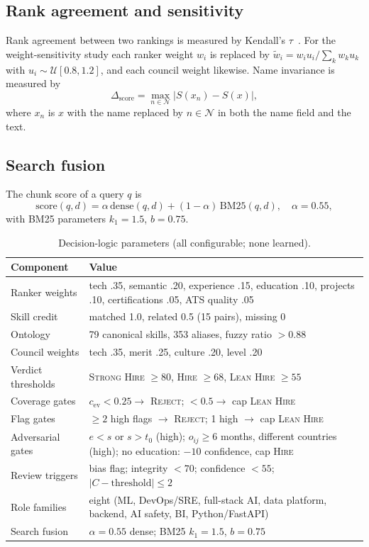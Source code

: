 \documentclass[conference]{IEEEtran}
\newcommand{\verd}[1]{\textsc{#1}}
\newcommand{\Sstrong}{\verd{Strong Hire}}
\newcommand{\Shire}{\verd{Hire}}
\newcommand{\Slean}{\verd{Lean Hire}}
\newcommand{\Sreject}{\verd{Reject}}
\begin{document}
\subsection{Rank agreement and sensitivity}
Rank agreement between two rankings is measured by Kendall's $\tau$~\cite{kendall}. For the weight-sensitivity study each ranker weight $w_i$ is replaced by $\tilde w_i=w_i u_i/\sum_k w_k u_k$ with $u_i\sim\mathcal U[0.8,1.2]$, and each council weight likewise. Name invariance is measured by
\begin{equation}
\Delta_{\mathrm{score}}=\max_{n\in\mathcal N}\bigl|S(x_n)-S(x)\bigr|,
\end{equation}
where $x_n$ is $x$ with the name replaced by $n\in\mathcal N$ in both the name field and the text.

\subsection{Search fusion}
The chunk score of a query $q$ is
\begin{equation}
\mathrm{score}(q,d)=\alpha\,\mathrm{dense}(q,d)+(1-\alpha)\,\mathrm{BM25}(q,d),\quad \alpha=0.55,
\label{eq:fusion}
\end{equation}
with BM25 parameters $k_1=1.5$, $b=0.75$.

\begin{table}[t]
\caption{Decision-logic parameters (all configurable; none learned).}
\label{tab:params}
\centering
\footnotesize
\renewcommand{\arraystretch}{1.1}
\begin{tabular}{@{}lp{5.6cm}@{}}
\toprule
Component & Value \\
\midrule
Ranker weights & tech .35, semantic .20, experience .15, education .10, projects .10, certifications .05, ATS quality .05 \\
Skill credit & matched 1.0, related 0.5 (15 pairs), missing 0 \\
Ontology & 79 canonical skills, 353 aliases, fuzzy ratio $>0.88$ \\
Council weights & tech .35, merit .25, culture .20, level .20 \\
Verdict thresholds & \Sstrong{} $\ge80$, \Shire{} $\ge68$, \Slean{} $\ge55$ \\
Coverage gates & $c_{\mathrm{ev}}<0.25\rightarrow$ \Sreject{}; $<0.5\rightarrow$ cap \Slean{} \\
Flag gates & $\ge2$ high flags $\rightarrow$ \Sreject{}; 1 high $\rightarrow$ cap \Slean{} \\
Adversarial gates & $e<s$ or $s>t_0$ (high); $o_{ij}\ge6$ months, different countries (high); no education: $-10$ confidence, cap \Shire{} \\
Review triggers & bias flag; integrity $<70$; confidence $<55$; $|C-\text{threshold}|\le2$ \\
Role families & eight (ML, DevOps/SRE, full-stack AI, data platform, backend, AI safety, BI, Python/FastAPI) \\
Search fusion & $\alpha=0.55$ dense; BM25 $k_1=1.5$, $b=0.75$ \\
\bottomrule
\end{tabular}
\end{table}
\end{document}
